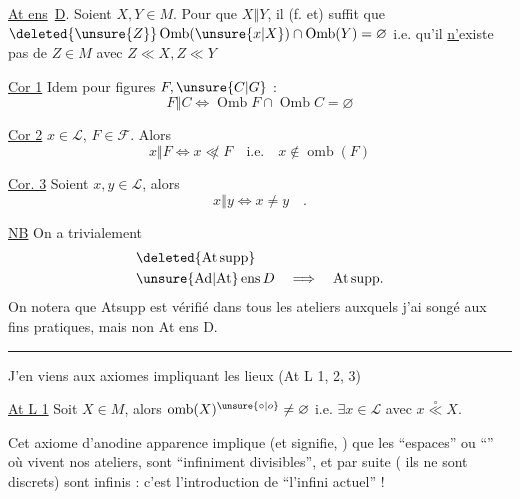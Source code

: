 \uline{At ens}\ \uline{D}.   Soient $X,Y\in M$. Pour que $X\mathrel{\Vert}Y$, il  (f. et) suffit que $\deleted{\unsure{Z}}\operatorname{Omb}(\unsure{x|X})\cap\operatorname{Omb}(Y)=\varnothing$ i.e. qu'il \uline{n'}existe pas de $Z\in M$ avec $Z\ll X,Z\ll Y$

\uline{Cor 1} Idem pour figures $F,\unsure{C|G}$ :
\[
 F\mathrel{\Vert}C\Longleftrightarrow \operatorname{Omb}F\cap\operatorname{Omb}C=\varnothing
\]

\uline{Cor 2}  $x\in\mathcal{L}$, $F\in\mathscr{F}$. Alors
\[
 x\mathrel{\Vert}F\Longleftrightarrow x\not\ll F\quad\text{i.e.}\quad x\notin\operatorname{omb}(F)
\]

\uline{Cor. 3} Soient $x,y\in\mathcal{L}$, alors
\[
 x\mathrel{\Vert}y\Longleftrightarrow x\ne y\quad .
\]

\uline{NB} On a trivialement
\[
 \begin{aligned}
 &\deleted{\mathrm{At\,supp}}\\
 &\unsure{\mathrm{Ad}|\mathrm{At}}\,\mathrm{ens}\,D\quad\Longrightarrow\quad\mathrm{At\,supp}.
 \end{aligned}
\]
On notera que Atsupp est vérifié dans tous les ateliers auxquels j'ai songé aux fins pratiques, mais non At ens D.

\begin{center}\rule{.24\linewidth}{.4pt}\end{center}

J'en viens aux axiomes impliquant les lieux (At L 1, 2, 3)

\noindent\vrule\hspace{.5em}\begin{minipage}{.94\linewidth}
\uline{At L 1}  Soit $X\in M$, alors $\operatorname{omb}(X)^{\unsure{\circ|o}}\ne\varnothing$ i.e. $\exists x\in\mathcal{L}$ avec $x\mathrel{\overset{\circ}{\ll}}X$.
\end{minipage}

Cet axiome d'anodine apparence implique  (et signifie, ) que les ``espaces'' ou ``'' où vivent nos ateliers, sont ``infiniment divisibles'', et par suite ( ils ne sont discrets) sont infinis : c'est l'introduction de ``l'infini actuel''  !

